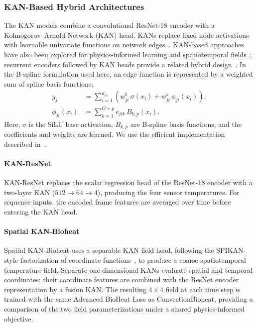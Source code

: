 \subsubsection{KAN-Based Hybrid Architectures}
\label{sec:kan_models}
The KAN models combine a convolutional ResNet-18 encoder with a
Kolmogorov--Arnold Network (KAN) head. KANs replace fixed node activations
with learnable univariate functions on network edges~\cite{liu2024kan}.
KAN-based approaches have also been explored for physics-informed learning
and spatiotemporal fields~\cite{wang2024kinn,patra2024pikan,jacob2025spikan};
recurrent encoders followed by KAN heads provide a related hybrid
design~\cite{shen2025alpkan}. In the B-spline formulation used here, an edge
function is represented by a weighted sum of spline basis functions:
\begin{align}
    y_j &= \sum_{i=1}^{d_{in}}
    \left( w^{b}_{ji}\,\sigma(x_i) +
    w^{s}_{ji}\,\phi_{ji}(x_i) \right), \\
    \phi_{ji}(x_i) &= \sum_{k=1}^{G+p} c_{jik}\,B_{k,p}(x_i).
\end{align}
Here, $\sigma$ is the SiLU base activation, $B_{k,p}$ are B-spline basis
functions, and the coefficients and weights are learned. We use the
efficient implementation described in~\cite{blealtan2024efficientkan}.

\paragraph{KAN-ResNet}
KAN-ResNet replaces the scalar regression head of the ResNet-18 encoder with
a two-layer KAN ($512\rightarrow64\rightarrow4$), producing the four sensor
temperatures. For sequence inputs, the encoded frame features are averaged
over time before entering the KAN head.

\paragraph{Spatial KAN-Bioheat}
Spatial KAN-Bioheat uses a separable KAN field head, following the
SPIKAN-style factorization of coordinate functions~\cite{jacob2025spikan}, to produce a coarse
spatiotemporal temperature field. Separate one-dimensional KANs evaluate
spatial and temporal coordinates; their coordinate features are combined
with the ResNet encoder representation by a fusion KAN. The resulting
$4\times4$ field at each time step is trained with the same Advanced BioHeat
Loss as ConvectionBioheat, providing a comparison of the two field
parameterizations under a shared physics-informed objective.

